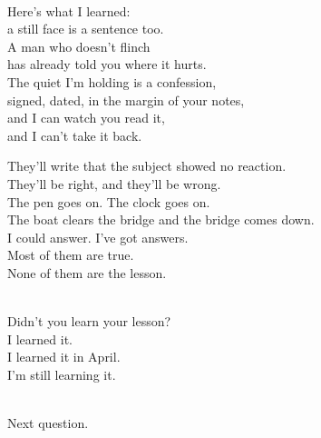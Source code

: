 \begin{lyrics}
\\
Here's what I learned:\\
a still face is a sentence too.\\
A man who doesn't flinch\\
has already told you where it hurts.\\
The quiet I'm holding is a confession,\\
signed, dated, in the margin of your notes,\\
and I can watch you read it,\\
and I can't take it back.

They'll write that the subject showed no reaction.\\
They'll be right, and they'll be wrong.\\
The pen goes on. The clock goes on.\\
The boat clears the bridge and the bridge comes down.\\
I could answer. I've got answers.\\
Most of them are true.\\
None of them are the lesson.

\\
Didn't you learn your lesson?\\
I learned it.\\
I learned it in April.\\
I'm still learning it.

\\
Next question.
\end{lyrics}


